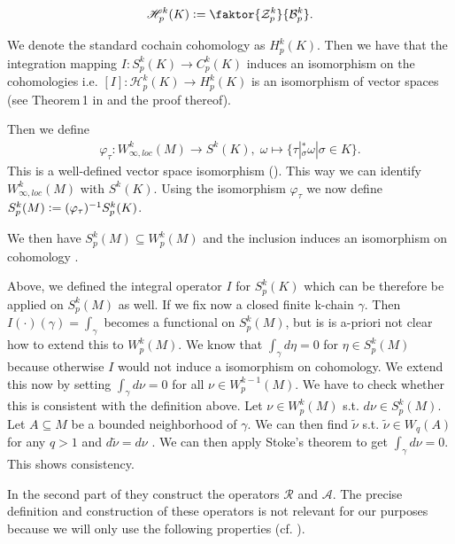 \documentclass[12pt,a4paper]{article}
\theoremstyle{definition}
\begin{document}
\begin{align*}
    \mathscr{H}_p^k(K) \vcentcolon= 
    \faktor{\mathcal{Z}_p^k}{\mathcal{B}_p^k}.
\end{align*}

We denote the standard cochain cohomology as $H^k_p(K)$. Then we have that the 
integration mapping
$I: S_p^k(K) \rightarrow C_p^k(K)$ 
induces an isomorphism on the cohomologies i.e.
$[I]: \mathscr{H}_p^k(K) \rightarrow H^k_p(K)$ is an isomorphism of vector 
spaces (see Theorem\,1 in \cite{goldshtein}
and the proof thereof).

Then we define 
\begin{align*}
\varphi_\tau: W^k_{\infty,loc}(M) \rightarrow S^k(K), \;
\omega \mapsto \{ \tau|_\sigma^*\omega | \sigma \in K \}.
\end{align*}
This is a well-defined vector space isomorphism (\cite[p.191]{goldshtein}). This
way we can identify $W^k_{\infty,loc}(M)$ with $S^k(K)$.  Using the
isomorphism $\varphi_\tau$ we now define 
$S^k_p(M) \vcentcolon= (\varphi_\tau)^{-1} S^k_p(K)$.

We then have $S^k_p(M) \subseteq W^k_p(M)$ and the inclusion induces an
isomorphism on cohomology \cite[Lemma 4, Corollary]{goldshtein}. 


Above, we defined the integral operator $I$ for $S^k_p(K)$ which can be 
therefore be applied on $S^k_p(M)$ as well. If we fix now a closed finite 
k-chain $\gamma$. Then $I(\cdot)(\gamma) = \int_\gamma$ becomes a functional on
$S^k_p(M)$, but is is a-priori not clear how to extend this to $W_p^k(M)$. 
We know that $\int_\gamma d\eta = 0$ for $\eta \in S^k_p(M)$ because 
otherwise $I$ would not induce a isomorphism on cohomology. We extend this now
by setting $\int_\gamma d\nu = 0$ for all $\nu \in W^{k-1}_p(M)$. 
We have to check whether this is consistent with the definition above. 
Let $\nu \in W_p^k(M)$ s.t. $d\nu \in S^k_p(M)$. Let $A \subseteq M$ be a 
bounded neighborhood of $\gamma$. We can then find 
$\tilde{\nu}$ s.t.  $\tilde{\nu} \in W_q(A)$ for any $q > 1$ and 
$d\tilde{\nu} = d\nu$ \cite[Thm 3.1.1]{schwarz}. We can then apply 
Stoke's theorem \cite[Thm. 9]{goldshtein_integration} to get  
$\int_\gamma d\nu = 0$. This shows consistency.

In the second part of \cite{goldshtein} they construct the operators
$\mathscr{R}$ and $\mathscr{A}$. The precise definition and construction of
these operators is not relevant for our purposes because we will only use
the following properties (cf. \cite[Thm.2]{goldshtein}).
\end{document}
